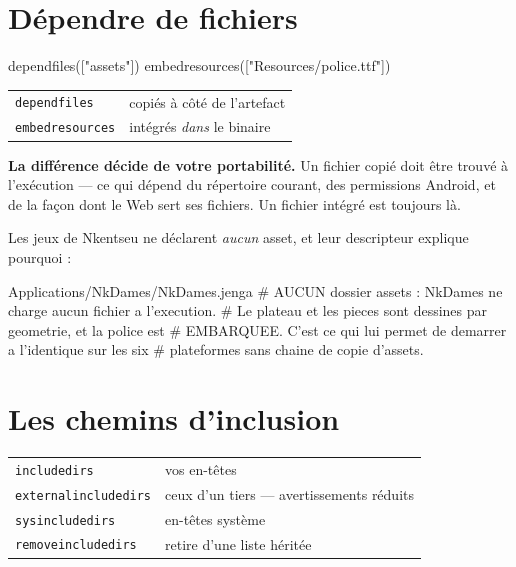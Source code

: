 \section{Dépendre de fichiers}

\begin{nkcode}{}
dependfiles(["assets"])
embedresources(["Resources/police.ttf"])
\end{nkcode}

\begin{center}
\begin{tabular}{@{}ll@{}}
\toprule
\texttt{dependfiles} & copiés à côté de l'artefact \\
\texttt{embedresources} & intégrés \emph{dans} le binaire \\
\bottomrule
\end{tabular}
\end{center}

\begin{nkretenir}
\textbf{La différence décide de votre portabilité.} Un fichier copié doit être
trouvé à l'exécution --- ce qui dépend du répertoire courant, des permissions
Android, et de la façon dont le Web sert ses fichiers. Un fichier intégré est
toujours là.

Les jeux de Nkentseu ne déclarent \emph{aucun} asset, et leur descripteur
explique pourquoi :

\begin{nkcode}{Applications/NkDames/NkDames.jenga}
# AUCUN dossier assets : NkDames ne charge aucun fichier a l'execution.
# Le plateau et les pieces sont dessines par geometrie, et la police est
# EMBARQUEE. C'est ce qui lui permet de demarrer a l'identique sur les six
# plateformes sans chaine de copie d'assets.
\end{nkcode}
\end{nkretenir}

\section{Les chemins d'inclusion}

\begin{center}
\begin{tabular}{@{}ll@{}}
\toprule
\texttt{includedirs} & vos en-têtes \\
\texttt{externalincludedirs} & ceux d'un tiers --- avertissements réduits \\
\texttt{sysincludedirs} & en-têtes système \\
\texttt{removeincludedirs} & retire d'une liste héritée \\
\bottomrule
\end{tabular}
\end{center}


